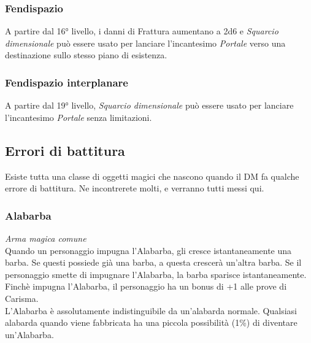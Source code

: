 \subsubsection{Fendispazio}
A partire dal 16° livello, i danni di Frattura aumentano a 2d6 e \textit{Squarcio dimensionale} può essere usato per lanciare l'incantesimo \textit{Portale} verso una destinazione sullo stesso piano di esistenza.

\subsubsection{Fendispazio interplanare}
A partire dal 19° livello, \textit{Squarcio dimensionale} può essere usato per lanciare l'incantesimo \textit{Portale} senza limitazioni.

\subsection{Errori di battitura}
Esiste tutta una classe di oggetti magici che nascono quando il DM fa qualche errore di battitura. Ne incontrerete molti, e verranno tutti messi qui.

\subsubsection{Alabarba}
\textit{Arma magica comune}\\
Quando un personaggio impugna l'Alabarba, gli cresce istantaneamente una barba. Se questi possiede già una barba, a questa crescerà un'altra barba. Se il personaggio smette di impugnare l'Alabarba, la barba sparisce istantaneamente. Finchè impugna l'Alabarba, il personaggio ha un bonus di +1 alle prove di Carisma.\\
L'Alabarba è assolutamente indistinguibile da un'alabarda normale. Qualsiasi alabarda quando viene fabbricata ha una piccola possibilità (1\%) di diventare un'Alabarba.